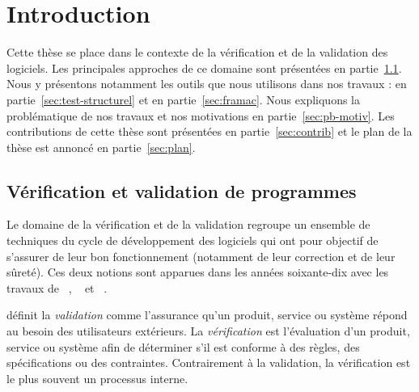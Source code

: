 
\chapter{Introduction}
\label{sec:intro}


\chapterintro


Cette thèse se place dans le contexte de la vérification et de la validation des
logiciels.
Les principales approches de ce domaine sont présentées en partie~\ref{sec:vv}.
Nous y présentons notamment les outils que nous utilisons dans nos travaux :
\pathcrawler en partie~\ref{sec:test-structurel} et \framac en
partie~\ref{sec:framac}.
Nous expliquons la problématique de nos travaux et nos motivations en
partie~\ref{sec:pb-motiv}.
Les contributions de cette thèse sont présentées en partie~\ref{sec:contrib} et
le plan de la thèse est annoncé en partie~\ref{sec:plan}.


\section{Vérification et validation de programmes}
\label{sec:vv}


Le domaine de la vérification et de la validation regroupe un ensemble de
techniques du cycle de développement des logiciels qui ont pour objectif de
s'assurer de leur bon fonctionnement (notamment de leur correction et de leur
sûreté).
Ces deux notions sont apparues dans les années soixante-dix avec les travaux de
~\cite{Dijkstra/75}, ~\cite{Floyd/63} et
~\cite{Hoare/69}.

\cite{PMBOK} définit la \emph{validation} comme l'assurance qu'un produit,
service ou système répond au besoin des utilisateurs extérieurs.
La \emph{vérification} est l'évaluation d'un produit, service ou système afin de
déterminer s'il est conforme à des règles, des spécifications ou des
contraintes.
Contrairement à la validation, la vérification est le plus souvent un processus
interne.

